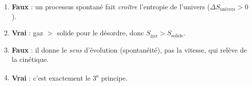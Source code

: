 \documentclass[11pt,a4paper]{article}
\begin{document}
\begin{corrige}
\begin{enumerate}[label=\alph*)]
  \item \textbf{Faux} : un processus spontané fait \emph{croître} l'entropie de l'univers ($\Delta S_{\text{univers}}>0$).
  \item \textbf{Vrai} : gaz $>$ solide pour le désordre, donc $S_{\text{gaz}}>S_{\text{solide}}$.
  \item \textbf{Faux} : il donne le \emph{sens} d'évolution (spontanéité), pas la vitesse, qui relève de la cinétique.
  \item \textbf{Vrai} : c'est exactement le 3\textsuperscript{e} principe.
\end{enumerate}
\end{corrige}
\end{document}
